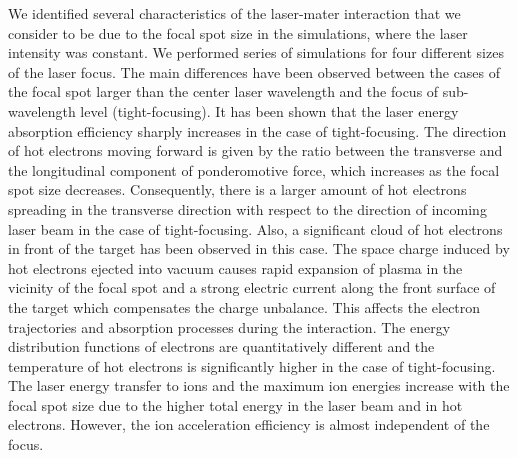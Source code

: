 We identified several characteristics of the laser-mater interaction that we consider to be due to the focal spot size in the simulations, where the laser intensity was constant. We performed series of simulations for four different sizes of the laser focus. The main differences have been observed between the cases of the focal spot larger than the center laser wavelength and the focus of sub-wavelength level (tight-focusing). It has been shown that the laser energy absorption efficiency sharply increases in the case of tight-focusing. The direction of hot electrons moving forward is given by the ratio between the transverse and the longitudinal component of ponderomotive force, which increases as the focal spot size decreases. Consequently, there is a larger amount of hot electrons spreading in the transverse direction with respect to the direction of incoming laser beam in the case of tight-focusing. Also, a significant cloud of hot electrons in front of the target has been observed in this case. The space charge induced by hot electrons ejected into vacuum causes rapid expansion of plasma in the vicinity of the focal spot and a strong electric current along the front surface of the target which compensates the charge unbalance. This affects the electron trajectories and absorption processes during the interaction. The energy distribution functions of electrons are quantitatively different and the temperature of hot electrons is significantly higher in the case of tight-focusing. The laser energy transfer to ions and the maximum ion energies increase with the focal spot size due to the higher total energy in the laser beam and in hot electrons. However, the ion acceleration efficiency is almost independent of the focus.

